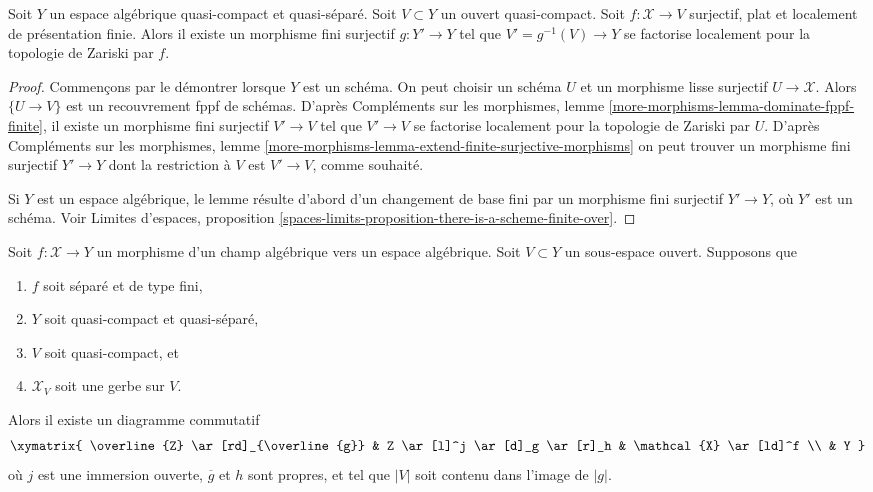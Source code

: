 \begin{lemma}
\label{lemma-finite-cover-factor}
Soit $Y$ un espace algébrique quasi-compact et quasi-séparé.
Soit $V \subset Y$ un ouvert quasi-compact. Soit $f : \mathcal{X} \to V$
surjectif, plat et localement de présentation finie.
Alors il existe un morphisme fini surjectif $g : Y' \to Y$ tel que
$V' = g^{-1}(V) \to Y$ se factorise localement pour la topologie de Zariski par $f$.
\end{lemma}

\begin{proof}
Commençons par le démontrer lorsque $Y$ est un schéma.
On peut choisir un schéma $U$ et un morphisme lisse surjectif
$U \to \mathcal{X}$. Alors $\{U \to V\}$ est un recouvrement fppf de schémas.
D'après Compléments sur les morphismes, lemme \ref{more-morphisms-lemma-dominate-fppf-finite},
il existe un morphisme fini surjectif
$V' \to V$ tel que $V' \to V$ se factorise localement pour la topologie de Zariski
par $U$. D'après
Compléments sur les morphismes, lemme
\ref{more-morphisms-lemma-extend-finite-surjective-morphisms}
on peut trouver un morphisme fini surjectif $Y' \to Y$
dont la restriction à $V$ est $V' \to V$, comme souhaité.

\medskip\noindent
Si $Y$ est un espace algébrique, le lemme résulte d'abord d'un
changement de base fini par un morphisme fini surjectif
$Y' \to Y$, où $Y'$ est un schéma. Voir
Limites d'espaces, proposition
\ref{spaces-limits-proposition-there-is-a-scheme-finite-over}.
\end{proof}

\begin{lemma}
\label{lemma-make-section}
Soit $f : \mathcal{X} \to Y$ un morphisme d'un champ algébrique
vers un espace algébrique. Soit $V \subset Y$ un sous-espace ouvert.
Supposons que
\begin{enumerate}
\item $f$ soit séparé et de type fini,
\item $Y$ soit quasi-compact et quasi-séparé,
\item $V$ soit quasi-compact, et
\item $\mathcal{X}_V$ soit une gerbe sur $V$.
\end{enumerate}
Alors il existe un diagramme commutatif
$$
\xymatrix{
\overline{Z} \ar[rd]_{\overline{g}} &
Z \ar[l]^j \ar[d]_g \ar[r]_h & \mathcal{X} \ar[ld]^f \\
& Y
}
$$
où $j$ est une immersion ouverte, $\overline{g}$ et $h$ sont propres,
et tel que $|V|$ soit contenu dans l'image de $|g|$.
\end{lemma}


